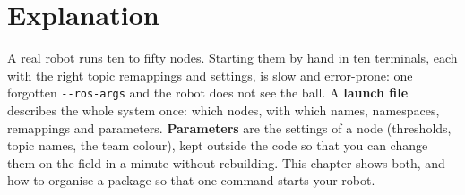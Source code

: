 \label{ch:ros3}

\section*{Explanation}
A real robot runs ten to fifty nodes. Starting them by hand in ten terminals, each with the right topic remappings and settings, is slow and error-prone: one forgotten \verb!--ros-args! and the robot does not see the ball. A \textbf{launch file} describes the whole system once: which nodes, with which names, namespaces, remappings and parameters. \textbf{Parameters} are the settings of a node (thresholds, topic names, the team colour), kept outside the code so that you can change them on the field in a minute without rebuilding. This chapter shows both, and how to organise a package so that one command starts your robot.

